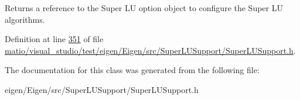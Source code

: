 \begin{DoxyReturn}{Returns}
a reference to the Super LU option object to configure the Super LU algorithms. 
\end{DoxyReturn}


Definition at line \hyperlink{matio_2visual__studio_2test_2eigen_2_eigen_2src_2_super_l_u_support_2_super_l_u_support_8h_source_l00351}{351} of file \hyperlink{matio_2visual__studio_2test_2eigen_2_eigen_2src_2_super_l_u_support_2_super_l_u_support_8h_source}{matio/visual\+\_\+studio/test/eigen/\+Eigen/src/\+Super\+L\+U\+Support/\+Super\+L\+U\+Support.\+h}.



The documentation for this class was generated from the following file\+:\begin{DoxyCompactItemize}
\item 
eigen/\+Eigen/src/\+Super\+L\+U\+Support/\+Super\+L\+U\+Support.\+h\end{DoxyCompactItemize}
